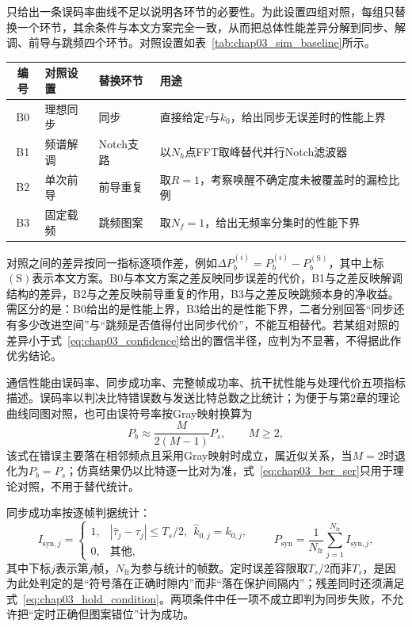 只给出一条误码率曲线不足以说明各环节的必要性。为此设置四组对照，每组只替换一个环节，其余条件与本文方案完全一致，从而把总体性能差异分解到同步、解调、前导与跳频四个环节。对照设置如表~\ref{tab:chap03_sim_baseline}所示。

\begin{table}[htbp]
 \vspace{0.5em}\centering\wuhao
 \begin{tabularx}{\linewidth}{@{}c l l X@{}}
 \toprule[1.5pt]
 编号 & 对照设置 & 替换环节 & 用途\\
 \midrule[1pt]
 B0 & 理想同步 & 同步 & 直接给定$\tau$与$k_0$，给出同步无误差时的性能上界\\
 B1 & 频谱解调 & Notch支路 & 以$N_h$点FFT取峰替代并行Notch滤波器\\
 B2 & 单次前导 & 前导重复 & 取$R=1$，考察唤醒不确定度未被覆盖时的漏检比例\\
 B3 & 固定载频 & 跳频图案 & 取$N_f=1$，给出无频率分集时的性能下界\\
 \bottomrule[1.5pt]
 \end{tabularx}
\end{table}

对照之间的差异按同一指标逐项作差，例如$\Delta P_b^{(i)}=P_b^{(i)}-P_b^{(\mathrm S)}$，其中上标$(\mathrm S)$表示本文方案。B0与本文方案之差反映同步误差的代价，B1与之差反映解调结构的差异，B2与之差反映前导重复的作用，B3与之差反映跳频本身的净收益。需区分的是：B0给出的是性能上界，B3给出的是性能下界，二者分别回答“同步还有多少改进空间”与“跳频是否值得付出同步代价”，不能互相替代。若某组对照的差异小于式~\eqref{eq:chap03_confidence}给出的置信半径，应判为不显著，不得据此作优劣结论。

通信性能由误码率、同步成功率、完整帧成功率、抗干扰性能与处理代价五项指标描述。误码率以判决比特错误数与发送比特总数之比统计；为便于与第2章的理论曲线同图对照，也可由误符号率按Gray映射换算为
\begin{equation}
 P_b\approx\frac{M}{2(M-1)}P_s,\qquad M\ge 2,
\label{eq:chap03_ber_ser}
\end{equation}
该式在错误主要落在相邻频点且采用Gray映射时成立，属近似关系，当$M=2$时退化为$P_b=P_s$；仿真结果仍以比特逐一比对为准，式~\eqref{eq:chap03_ber_ser}只用于理论对照，不用于替代统计。

同步成功率按逐帧判据统计：
\begin{equation}
 I_{\mathrm{syn},j}=
 \begin{cases}
 1, & |\hat\tau_j-\tau_j|\le T_s/2,\ \ \hat k_{0,j}=k_{0,j},\\
 0, & \text{其他},
 \end{cases}
\qquad
 P_{\mathrm{syn}}=\frac{1}{N_{\mathrm{fr}}}\sum_{j=1}^{N_{\mathrm{fr}}}I_{\mathrm{syn},j},
\label{eq:chap03_sync_success}
\end{equation}
其中下标$j$表示第$j$帧，$N_{\mathrm{fr}}$为参与统计的帧数。定时误差容限取$T_s/2$而非$T_s$，是因为此处判定的是“符号落在正确时隙内”而非“落在保护间隔内”；残差同时还须满足式~\eqref{eq:chap03_hold_condition}。两项条件中任一项不成立即判为同步失败，不允许把“定时正确但图案错位”计为成功。

